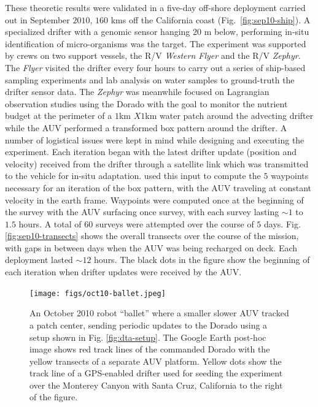 These theoretic results were validated in a five-day
off-shore deployment carried out in September $2010$, $160$ kms off
the California coast (Fig.~\ref{fig:sep10-ship}). A specialized
drifter with a genomic sensor \cite{scholin09} hanging $20$ m below,
performing in-situ identification of micro-organisms was the
target. The experiment was supported by crews on two support vessels,
the R/V \emph{Western Flyer} and the R/V \emph{Zephyr}. The
\emph{Flyer} visited the drifter every four hours to carry out a
series of ship-based sampling experiments and lab analysis on water
samples to ground-truth the drifter sensor data. The \emph{Zephyr} was
meanwhile focused on Lagrangian observation studies using the Dorado
with the goal to monitor the nutrient budget at the perimeter of a
$1$km $X 1$km water patch around the advecting drifter while the AUV
performed a transformed box pattern around the drifter. A number of
logistical issues were kept in mind while designing and executing the
experiment. Each iteration began with the latest drifter update
(position and velocity) received from the drifter through a satellite
link which was transmitted to the vehicle for in-situ adaptation. \rx
used this input to compute the $5$ waypoints necessary for an
iteration of the box pattern, with the AUV traveling at constant
velocity in the earth frame. Waypoints were computed once at the
beginning of the survey with the AUV surfacing once  survey, with each survey lasting $\sim1$ to $1.5$ hours. A
total of $60$ surveys were attempted over the course of $5$
days. Fig. \ref{fig:sep10-transects} shows the overall transects over
the course of the mission, with gaps in between days when the AUV was
being recharged on deck. Each deployment lasted $\sim12$ hours. The
black dots in the figure show the beginning of each iteration when
drifter updates were received by the AUV.


\begin{figure}[t]
\centering
\texttt{[image: figs/oct10-ballet.jpeg]}
\caption{\small An October 2010 robot ``ballet'' where a smaller
  slower AUV tracked a patch center, sending periodic updates to the
  Dorado using a setup shown in Fig. \ref{fig:dta-setup}. The Google
  Earth post-hoc image shows {\color{red}red} track lines of the \rx
  commanded Dorado with the {\color{yellow}yellow} transects of a
  separate AUV platform. {\color{yellow}Yellow} dots show the track
  line of a GPS-enabled drifter used for seeding the experiment over
  the Monterey Canyon with Santa Cruz, California to the right of the
  figure.}
\label{fig:ballet}
\end{figure}

